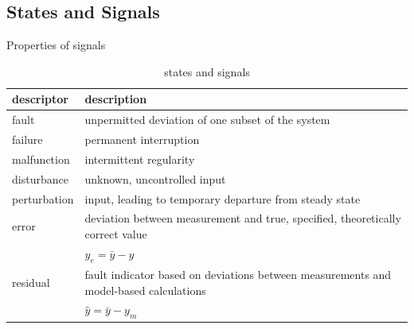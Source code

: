 \subsection{States and Signals}
Properties of signals

\label{chap:metadata_states}
\begin{table}[!h]
    \centering
    \begin{tabular}{@{}ll@{}}
        \toprule
        descriptor   & description                                                                           \\ \midrule
        fault        & unpermitted deviation of one subset of the system                                     \\
        failure      & permanent interruption                                                                \\
        malfunction  & intermittent regularity                                                               \\
        disturbance  & unknown, uncontrolled input                                                           \\
        perturbation & input, leading to temporary departure from steady state                               \\
        error        & deviation between measurement and true, specified, theoretically correct value        \\     & $y_e = \bar{y} -y$ \\
        residual     & fault indicator based on deviations between measurements and model-based calculations \\     & $\hat{y} = \bar{y} -y_m$ \\ \bottomrule
    \end{tabular}
    \caption{states and signals}
\end{table}

